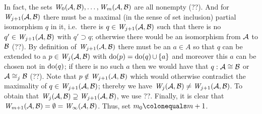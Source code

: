 \begin{enumerate}[1.]
In fact, the sets $\winpos{0}(\strct{A}, \strct{B}), \etc, \winpos{m}(\strct{A}, \strct{B})$ are all nonempty (??). And for $\winpos{j + 1}(\strct{A}, \strct{B})$ there must be a maximal (in the sense of set inclusion) partial isomorphism $q$ in it, i.e.\ there is $q \in \winpos{j + 1}(\strct{A}, \strct{B})$ such that there is no $q' \in \winpos{j + 1}(\strct{A}, \strct{B})$ with $q' \supset q$; otherwise there would be an isomorphism from $\mathcal{A}$ to $\mathcal{B}$ (??). By definition of $\winpos{j + 1}(\strct{A}, \strct{B})$ there must be an $a \in A$ so that $q$ can be extended to a $p \in \winpos{j}(\strct{A}, \strct{B})$ with $\mathrm{do}(p) = \mathrm{do}(q) \mathop{\cup} {\{a\}}$ and moreover this $a$ can be chosen not in $\mathrm{do}(q)$; if there is no such $a$ then we would have that $q : \strct{A} \isom \strct{B}$ or $\strct{A} \isom_j \strct{B}$ (??). Note that $p \notin \winpos{j + 1}(\strct{A}, \strct{B})$ which would otherwise contradict the maximality of $q \in \winpos{j + 1}(\strct{A}, \strct{B})$; thereby we have $\winpos{j}(\strct{A}, \strct{B}) \neq \winpos{j + 1}(\strct{A}, \strct{B})$. To obtain that $\winpos{j}(\strct{A}, \strct{B}) \supseteq \winpos{j + 1}(\strct{A}, \strct{B})$, we use ??. Finally, it is clear that $\winpos{m + 1}(\strct{A}, \strct{B}) = \emptyset = \winpos{\infty}(\strct{A}, \strct{B})$. Thus, set $m_0 \defas m + 1$.
%
\end{enumerate}
